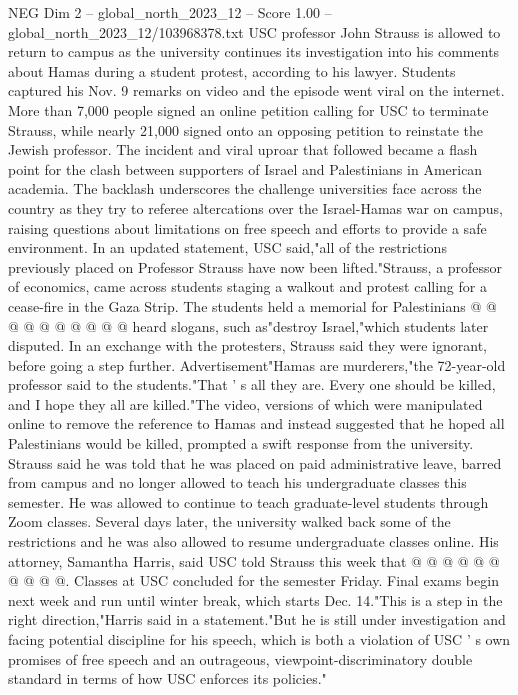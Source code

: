 \begin{textsample}{NEG Dim 2 – global\_north\_2023\_12 – Score 1.00 – global\_north\_2023\_12/103968378.txt}  \label{ex:f2_neg_210}
USC professor John Strauss is allowed to return to campus as the university continues its investigation into his comments about Hamas during a student protest, according to his lawyer.
Students captured his Nov. 9 remarks on video and the episode went viral on the internet.
More than 7,000 people signed an online petition calling for USC to terminate Strauss, while nearly 21,000 signed onto an opposing petition to reinstate the Jewish professor.
The incident and viral uproar that followed became a flash point for the clash between supporters of Israel and Palestinians in American academia.
The backlash underscores the challenge universities face across the country as they try to referee altercations over the Israel-Hamas war on campus, raising questions about limitations on free speech and efforts to provide a safe environment.
In an updated statement, USC said,"all of the restrictions previously placed on Professor Strauss have now been lifted."Strauss, a professor of economics, came across students staging a walkout and protest calling for a cease-fire in the Gaza Strip.
The students held a memorial for Palestinians @ @ @ @ @ @ @ @ @ @ heard slogans, such as"destroy Israel,"which students later disputed.
In an exchange with the protesters, Strauss said they were ignorant, before going a step further.
Advertisement"Hamas are murderers,"the 72-year-old professor said to the students."That ' s all they are.
Every one should be killed, and I hope they all are killed."The video, versions of which were manipulated online to remove the reference to Hamas and instead suggested that he hoped all Palestinians would be killed, prompted a swift response from the university.
Strauss said he was told that he was placed on paid administrative leave, barred from campus and no longer allowed to teach his undergraduate classes this semester.
He was allowed to continue to teach graduate-level students through Zoom classes.
Several days later, the university walked back some of the restrictions and he was also allowed to resume undergraduate classes online.
His attorney, Samantha Harris, said USC told Strauss this week that @ @ @ @ @ @ @ @ @ @.
Classes at USC concluded for the semester Friday.
Final exams begin next week and run until winter break, which starts Dec. 14."This is a step in the right direction,"Harris said in a statement."But he is still under investigation and facing potential discipline for his speech, which is both a violation of USC ' s own promises of free speech and an outrageous, viewpoint-discriminatory double standard in terms of how USC enforces its policies."

\end{textsample}
